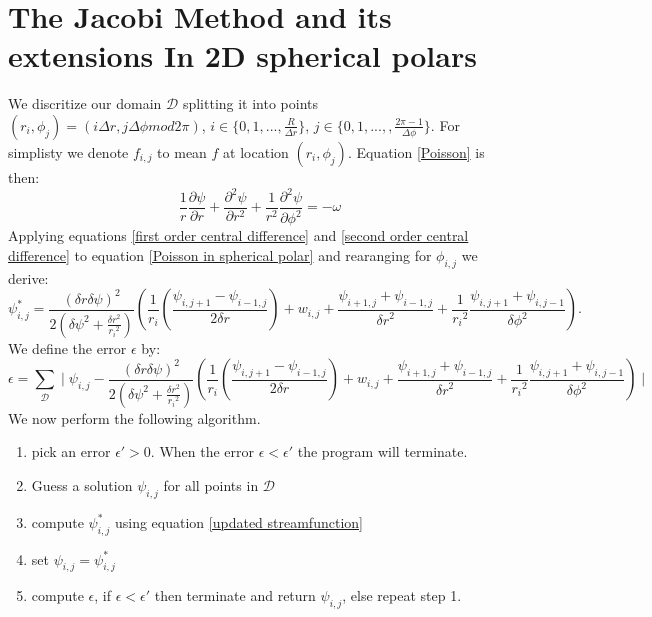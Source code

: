 \documentclass{article}
\begin{document}
\section*{The Jacobi Method and its extensions In 2D spherical polars}
We discritize our domain $\mathcal{D}$ splitting it into points $(r_i, \phi_j) = (i \Delta r, j \Delta \phi mod 2 \pi)$, $i \in \{0, 1, ..., \frac{R}{\Delta r} \}$, $j \in \{ 0,1, ...,, \frac{2 \pi - 1}{\Delta \phi}\}$. For simplisty we denote $f_{i,j}$ to mean $f$ at location $(r_i, \phi_j)$. Equation \ref{Poisson} is then:
\begin{equation}
	\frac{1}{r} \frac{\partial \psi}{\partial r} + \frac{\partial^2 \psi}{\partial r^2} + \frac{1}{r^2} \frac{\partial^2 \psi}{\partial \phi^2} = -\omega
	\label{Poisson in spherical polar}
\end{equation}
Applying equations \ref{first order central difference} and \ref{second order central difference} to equation \ref{Poisson in spherical polar} and rearanging for $\phi_{i,j}$ we derive:
\begin{equation}
	\psi_{i,j}^{*} = \frac{(\delta r \delta \psi)^2}{2 ( {\delta \psi}^2 + \frac{ {\delta r}^2}{{r_i}^2})} ( \frac{1}{r_i} (\frac{\psi_{i,j+1}-\psi_{i-1,j}}{2 \delta r}) +w_{i,j} + \frac{\psi_{i+1,j} + \psi_{i-1,j}}{ {\delta r}^2 } + \frac{1}{ {r_i}^2 } \frac{\psi_{i,j+1} + \psi_{i,j-1}}{ {\delta \phi}^2 }  ).
	\label{updated streamfunction}
\end{equation}
We define the error $\epsilon$ by:
\begin{equation}
	\epsilon = \sum_{\mathcal{D}} \mid  	\psi_{i,j} - \frac{(\delta r \delta \psi)^2}{2 ( {\delta \psi}^2 + \frac{ {\delta r}^2}{{r_i}^2})} ( \frac{1}{r_i} (\frac{\psi_{i,j+1}-\psi_{i-1,j}}{2 \delta r}) +w_{i,j} + \frac{\psi_{i+1,j} + \psi_{i-1,j}}{ {\delta r}^2 } + \frac{1}{ {r_i}^2 } \frac{\psi_{i,j+1} + \psi_{i,j-1}}{ {\delta \phi}^2 }  )  \mid
\end{equation}
We now perform the following algorithm.
\newline
\begin{enumerate}
	\item pick an error $\epsilon' > 0$. When the error $\epsilon < \epsilon'$ the program will terminate.
	\item Guess a solution $\psi_{i,j}$ for all points in $\mathcal{D}$
	\item compute $\psi_{i,j}^{*}$ using equation \ref{updated streamfunction}
	\item set $\psi_{i,j} = \psi_{i,j}^{*}$
	\item compute $\epsilon$, if $\epsilon < \epsilon'$ then terminate and return $\psi_{i,j}$, else repeat step 1.  
\end{enumerate}
\end{document}
